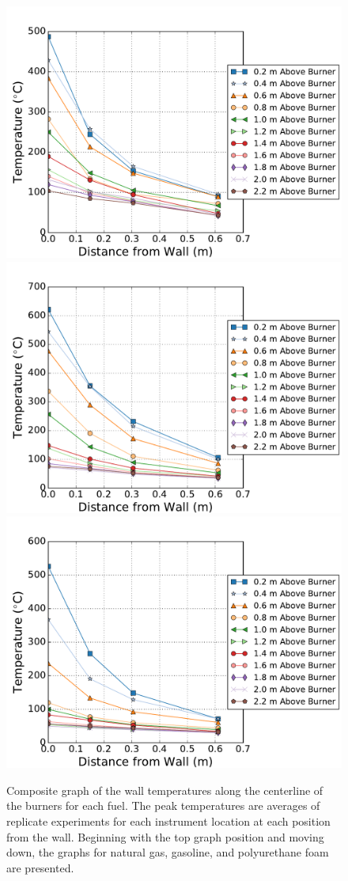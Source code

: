 \documentclass[twoside]{uocthesis}
\begin{document}
{\begin{figure}[p]
	\centering
	\includegraphics[width=.6\columnwidth]{../Figures/NCTW_NG_TC_Surface_Center_Avg}\\
	\includegraphics[width=.6\columnwidth]{../Figures/NCTW_GAS_TC_Surface_Center_Avg}\\
	\includegraphics[width=.6\columnwidth]{../Figures/NCTW_PUF_TC_Surface_Center_Avg}\\
	\caption[Composite graph of the wall temperatures along the centerline of the burners]{Composite graph of the wall temperatures along the centerline of the burners for each fuel. The peak temperatures are averages of replicate experiments for each instrument location at each position from the wall. Beginning with the top graph position and moving down, the graphs for natural gas, gasoline, and polyurethane foam are presented.}
	\label{NCTW_Surf_Center_comp}
\end{figure}

}
\end{document}
